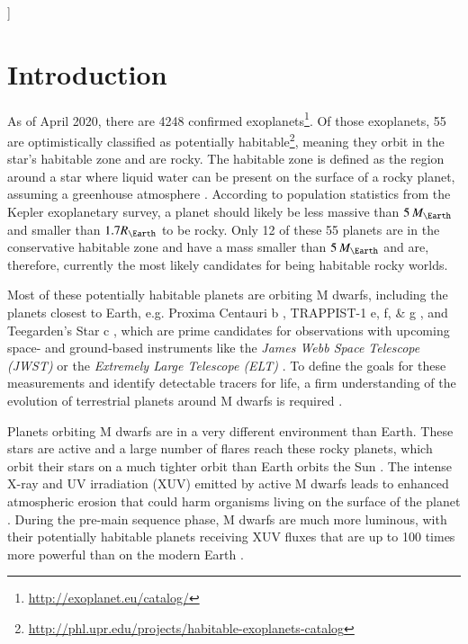 \documentclass[paper=letterpaper,fontsize=12pt,oneside,twocolumn]{article}
\newcommand{\eg}{e.g. }
\begin{document}
\begin{@twocolumnfalse}
\begin{abstract}
\end{abstract}
\end{@twocolumnfalse}
]

\section{Introduction}
As of April 2020, there are 4248 confirmed exoplanets\footnote{\url{http://exoplanet.eu/catalog/}}.
Of those exoplanets, 55 are optimistically classified as potentially habitable\footnote{\url{http://phl.upr.edu/projects/habitable-exoplanets-catalog}}, meaning they orbit in the star's habitable zone and are rocky. The habitable zone is defined as the region around a star where liquid water can be present on the surface of a rocky planet, assuming a greenhouse atmosphere \citep{Huang1959, Kasting1993, Kopparapu2013}. According to population statistics from the Kepler exoplanetary survey, a planet should likely be less massive than $5 \, M_\Earth$ \citep{Otegi2020} and smaller than $1.7 R_{\Earth}$ \citep[\eg][]{Ginzburg2018} to be rocky.
Only 12 of these 55 planets are in the conservative habitable zone and have a mass smaller than $5 \, M_\Earth$ and are, therefore, currently the most likely candidates for being habitable rocky worlds.

Most of these potentially habitable planets are orbiting M dwarfs, including the planets closest to Earth, \eg Proxima Centauri b \citep{Anglada-Escude2016}, TRAPPIST-1 e, f, \& g \citep{Gillon2016}, and Teegarden's Star c \citep{Zechmeister2019}, which are prime candidates for observations with upcoming space- and ground-based instruments like the \textit{James Webb Space Telescope (JWST)} \citep{Barstow2016, Snellen2017, Lincowski2018} or the \textit{Extremely Large Telescope (ELT)} \citep{Snellen2015, Meadows2017}.
To define the goals for these measurements and identify detectable tracers for life, a firm understanding of the evolution of terrestrial planets around M dwarfs is required \citep{Meadows2017b, Catling2018}.

Planets orbiting M dwarfs are in a very different environment than Earth.
These stars are active and a large number of flares reach these rocky planets, which orbit their stars on a much tighter orbit than Earth orbits the Sun \citep{Vida2017a, Gunther2020}. The intense X-ray and UV irradiation (XUV) emitted by active M dwarfs leads to enhanced atmospheric erosion \citep{Watson1981, Lammer2003, Lammer2009, Erkaev2007, Owen2012} that could harm organisms living on the surface of the planet \citep{Lammer2007}.
During the pre-main sequence phase, M dwarfs are much more luminous, with their potentially habitable planets receiving XUV fluxes that are up to 100 times more powerful than on the modern Earth \citep{Lammer2007}.
\end{document}
